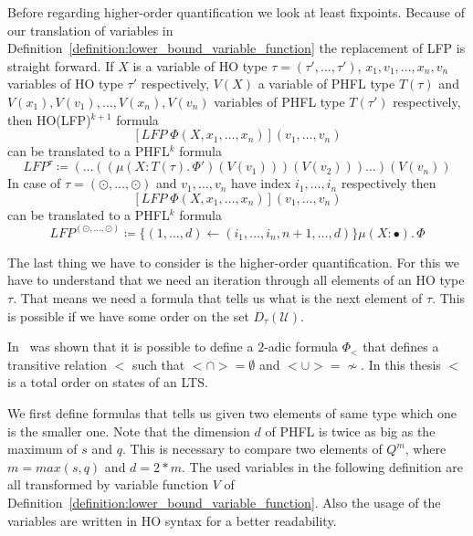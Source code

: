 Before regarding higher-order quantification we look at least fixpoints. Because of our translation of variables in
Definition~\ref{definition:lower_bound_variable_function} the replacement of LFP is straight forward. If $X$ is a
variable of HO type $\tau = (\tau', \dots, \tau')$, $x_1, v_1, \dots, x_n, v_n$ variables of HO type $\tau'$
respectively, $V(X)$ a variable of PHFL type $T(\tau)$ and $V(x_1), V(v_1), \dots, V(x_n), V(v_n)$
variables of PHFL type $T(\tau')$ respectively, then HO(LFP)$^{k + 1}$ formula
\[[LFP\;\Phi(X, x_1,\dots, x_n)](v_1, \dots, v_n)\]
can be translated to a PHFL$^k$ formula
\[LFP^\tau \coloneqq (\dots ((\mu (X \colon T(\tau).\,\Phi')(V(v_1)))(V(v_2)))\dots)(V(v_n))\]
In case of $\tau = (\odot, \dots, \odot)$ and $v_1, \dots, v_n$ have index $i_1, \dots, i_n$ respectively then
\[[LFP\;\Phi(X, x_1,\dots, x_n)](v_1, \dots, v_n)\]
can be translated to a PHFL$^k$ formula
\[LFP^{(\odot, \dots, \odot)} \coloneqq \{(1, \dots, d) \leftarrow (i_1, \dots, i_n, n + 1, \dots, d)\} \mu (X \colon
\bullet).\,\Phi\]

The last thing we have to consider is the higher-order quantification. For this we have to understand that we need an
iteration through all elements of an HO type $\tau$. That means we need a formula that tells us what is the next element
of $\tau$. This is possible if we have some order on the set $D_\tau(\mathcal{U})$.

\begin{remark}
    In~\cite{otto1999bisimulation} was shown that it is possible to define a $2$-adic formula $\Phi_<$ that defines a
    transitive relation $<$ such that $< \cap > = \emptyset$ and $< \cup > = \not\sim$. In this thesis $<$ is a total
    order on states of an LTS.
\end{remark}

We first define formulas that tells us given two elements of same type which one is the smaller one. Note that the
dimension $d$ of PHFL is twice as big as the maximum of $s$ and $q$. This is necessary to compare two elements of
$Q^{m}$, where $m = max({s, q})$ and $d = 2 * m$. The used variables in the following definition are all transformed by
variable function $V$ of Definition~\ref{definition:lower_bound_variable_function}. Also the usage of the variables
are written in HO syntax for a better readability.

